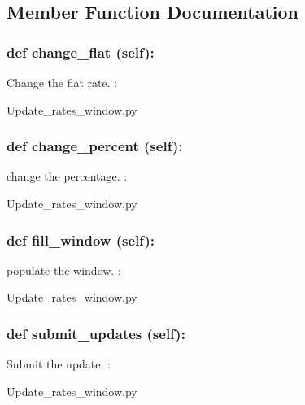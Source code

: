 \subsection{Member Function Documentation}
\hypertarget{class_poly_a14a7ad77ce612b0c54f531d307ee4b39}{
\subsubsection[{def change_flat (self):}]{\setlength{\rightskip}{0pt plus 5cm}def {change\_flat} (self):}}\label{class_poly_a14a7ad77ce612b0c54f531d307ee4b39}
Change the flat rate.
:\begin{DoxyCompactItemize}
\item 
Update\_rates\_window.\-py\end{DoxyCompactItemize}

\hypertarget{class_poly_a14a7ad77ce612b0c54f531d307ee4b39}{
\subsubsection[{def change_percent (self):}]{\setlength{\rightskip}{0pt plus 5cm}def {change\_percent} (self):}}\label{class_poly_a14a7ad77ce612b0c54f531d307ee4b39}
change the percentage.
:\begin{DoxyCompactItemize}
\item 
Update\_rates\_window.\-py\end{DoxyCompactItemize}

\hypertarget{class_poly_a14a7ad77ce612b0c54f531d307ee4b39}{
\subsubsection[{def fill_window (self):}]{\setlength{\rightskip}{0pt plus 5cm}def {fill\_window} (self):}}\label{class_poly_a14a7ad77ce612b0c54f531d307ee4b39}
populate the window.
:\begin{DoxyCompactItemize}
\item 
Update\_rates\_window.\-py\end{DoxyCompactItemize}

\hypertarget{class_poly_a14a7ad77ce612b0c54f531d307ee4b39}{
\subsubsection[{def submit_updates (self):}]{\setlength{\rightskip}{0pt plus 5cm}def {submit\_updates} (self):}}\label{class_poly_a14a7ad77ce612b0c54f531d307ee4b39}
Submit the update.
:\begin{DoxyCompactItemize}
\item 
Update\_rates\_window.\-py\end{DoxyCompactItemize}

